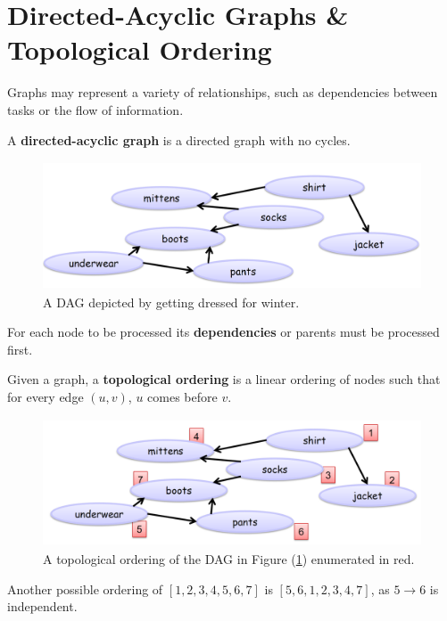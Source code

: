 \section{Directed-Acyclic Graphs \& Topological Ordering}
Graphs may represent a variety of relationships, such as dependencies between tasks or the flow of information. 

\begin{Def}
    A \textbf{directed-acyclic graph} is a directed graph with no cycles.
\end{Def}

\begin{figure}[h]
    \begin{center}
      \includegraphics[height=1.5in]{./Sections/graphs/dag/dag.png}
    \end{center}
     \caption{A DAG depicted by getting dressed for winter.}\label{fig:dag}
\end{figure}

\noindent
For each node to be processed its \textbf{dependencies} or parents must be processed first.

\newpage
\begin{Def}

    Given a graph, a \textbf{topological ordering} is a linear ordering of nodes such that for every edge $(u,v)$, $u$ comes before $v$.
\end{Def}

\begin{figure}[h]
    \begin{center}
      \includegraphics[height=1.5in]{./Sections/graphs/dag/top.png}
    \end{center}
     \caption{A topological ordering of the DAG in Figure (\ref{fig:dag}) enumerated in red.}\label{fig:top}
\end{figure}
\noindent
Another possible ordering of $[1,2,3,4,5,6,7]$ is $[5, 6,1,2,3,4,7]$, as $5\rightarrow 6$ is independent.


